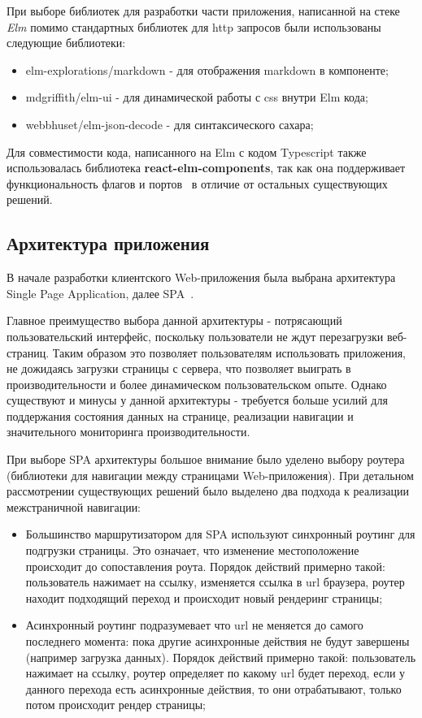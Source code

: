 \documentclass[a4paper,12pt,reqno]{article}
\begin{document}
При выборе библиотек для разработки части приложения, написанной на стеке \textit{Elm} помимо стандартных библиотек для http запросов были использованы следующие библиотеки:
\begin{itemize}
    \item elm-explorations/markdown - для отображения  markdown\cite{md} в компоненте;
    \item mdgriffith/elm-ui - для динамической работы с css внутри Elm кода;
    \item webbhuset/elm-json-decode - для синтаксического сахара;
\end{itemize}

Для совместимости кода, написанного на Elm с кодом Typescript также использовалась библиотека \textbf{react-elm-components}, так как она поддерживает функциональность флагов и портов~\cite{elm-ports} в отличие от остальных существующих решений.


\subsection{Архитектура приложения}

В начале разработки клиентского Web-приложения была выбрана архитектура Single Page Application, далее SPA~\cite{spa}. 

Главное преимущество выбора данной архитектуры - потрясающий пользовательский интерфейс, поскольку пользователи не ждут перезагрузки веб-страниц. Таким образом это позволяет пользователям использовать приложения, не дожидаясь загрузки страницы с сервера, что позволяет выиграть в производительности и более динамическом пользовательском опыте. Однако существуют и минусы у данной архитектуры - требуется больше усилий для поддержания состояния данных на странице, реализации навигации и значительного мониторинга производительности. 

При выборе SPA архитектуры большое внимание было уделено выбору роутера (библиотеки для навигации между страницами Web-приложения). При детальном рассмотрении существующих решений было выделено два подхода к реализации межстраничной навигации:

\begin{itemize}
    \item Большинство маршрутизатором для SPA используют синхронный роутинг для подгрузки страницы. Это означает, что изменение местоположение происходит до сопоставления роута. Порядок действий примерно такой: пользователь нажимает на ссылку, изменяется ссылка в url браузера, роутер находит подходящий переход и происходит новый рендеринг страницы;
    \item Асинхронный роутинг подразумевает что url не меняется до самого последнего момента: пока другие асинхронные действия не будут завершены (например загрузка данных). Порядок действий примерно такой: пользователь нажимает на ссылку, роутер определяет по какому url будет переход, если у данного перехода есть асинхронные действия, то они отрабатывают, только потом происходит рендер страницы;
\end{itemize}
\end{document}
